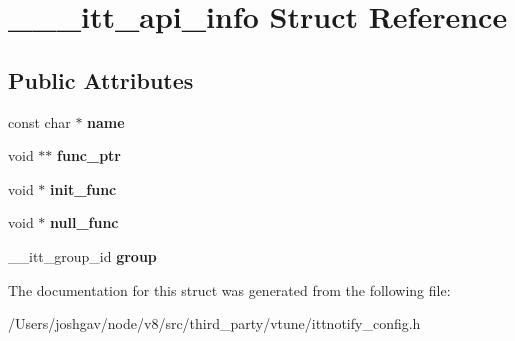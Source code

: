 \hypertarget{struct______itt__api__info}{}\section{\+\_\+\+\_\+\+\_\+itt\+\_\+api\+\_\+info Struct Reference}
\label{struct______itt__api__info}
\subsection*{Public Attributes}
\begin{DoxyCompactItemize}
\item 
const char $\ast$ {\bfseries name}\hypertarget{struct______itt__api__info_abb7f1e06b74fb586eb8d1e7570cd6263}{}\label{struct______itt__api__info_abb7f1e06b74fb586eb8d1e7570cd6263}

\item 
void $\ast$$\ast$ {\bfseries func\+\_\+ptr}\hypertarget{struct______itt__api__info_a3f5d0605499d1a9911080be2fabfc18b}{}\label{struct______itt__api__info_a3f5d0605499d1a9911080be2fabfc18b}

\item 
void $\ast$ {\bfseries init\+\_\+func}\hypertarget{struct______itt__api__info_a21210573f2cde6f6b8c781da860dad7b}{}\label{struct______itt__api__info_a21210573f2cde6f6b8c781da860dad7b}

\item 
void $\ast$ {\bfseries null\+\_\+func}\hypertarget{struct______itt__api__info_ab182f072fe2a2f4740be6b1d0499348f}{}\label{struct______itt__api__info_ab182f072fe2a2f4740be6b1d0499348f}

\item 
\+\_\+\+\_\+itt\+\_\+group\+\_\+id {\bfseries group}\hypertarget{struct______itt__api__info_a42bda2bfa667003e920bbf6995f5d375}{}\label{struct______itt__api__info_a42bda2bfa667003e920bbf6995f5d375}

\end{DoxyCompactItemize}


The documentation for this struct was generated from the following file\+:\begin{DoxyCompactItemize}
\item 
/\+Users/joshgav/node/v8/src/third\+\_\+party/vtune/ittnotify\+\_\+config.\+h\end{DoxyCompactItemize}
